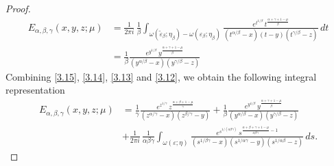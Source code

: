 \documentclass[12pt, reqno]{amsart}
\theoremstyle{definition}
\theoremstyle{remark}
\numberwithin{equation}{section}
\begin{document}
\begin{proof}
\begin{equation}
\begin{aligned}
E_{\alpha,\beta,\gamma}(x,y,z;\mu)
&=
\frac{1}{2\pi i}\,
\frac{1}{\beta}
\int_{\omega(\widetilde{\varepsilon}_{\beta};\eta_\beta)-\omega(\varepsilon_{\beta};\eta_\beta)}
\frac{
e^{t^{1/\beta}}
\,t^{\frac{\alpha+\gamma+1-\mu}{\beta}}
}
{
(t^{\alpha/\beta}-x)(t-y)(t^{\gamma/\beta}-z)
}
\,dt\\
&=\frac{1}{\beta}\frac{
e^{y^{1/\beta}}
\,y^{\frac{\alpha+\gamma+1-\mu}{\beta}}}
{(y^{\alpha/\beta}-x)(y^{\gamma/\beta}-z)}\end{aligned}
\end{equation}
Combining  \eqref{3.15}, \eqref{3.14}, \eqref{3.13} and \eqref{3.12}, we obtain the following integral representation 
\begin{equation}\label{3.16}\begin{aligned}
E_{\alpha,\beta,\gamma}(x,y,z;\mu)
&=\frac{1}{\gamma}\frac{
e^{z^{1/\gamma}}
\,z^{\frac{\alpha+\beta+1-\mu}{\gamma}}}
{(z^{\alpha/\gamma}-x)(z^{\beta/\gamma}-y)}+\frac{1}{\beta}\frac{
e^{y^{1/\beta}}
\,y^{\frac{\alpha+\gamma+1-\mu}{\beta}}}
{(y^{\alpha/\beta}-x)(y^{\gamma/\beta}-z)}\\
&+
\frac{1}{2\pi i}\,
\frac{1}{\alpha\beta\gamma}
\int_{\omega(\varepsilon;\eta)}
\frac{
e^{s^{1/(\alpha\beta\gamma)}}
\,s^{\frac{\alpha+\beta+\gamma+1-\mu}{\alpha\beta\gamma}-1}
}
{
(s^{1/\beta\gamma}-x)(s^{1/\alpha\gamma}-y)(s^{1/\alpha\beta}-z)
}
\,ds.\end{aligned}\end{equation}


\end{proof}
\end{document}
